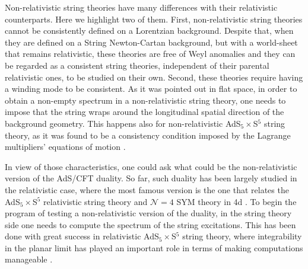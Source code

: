 \documentclass[12pt]{article}
\numberwithin{equation}{section}
\begin{document}
Non-relativistic string theories have many differences with their relativistic counterparts. Here we highlight two of them. First, non-relativistic string theories cannot be consistently defined on a Lorentzian background. Despite that, when they are defined on a String Newton-Cartan background, but with a world-sheet that remains relativistic, these theories are free of Weyl anomalies \cite{Gomis:2019zyu,Gallegos:2019icg} and they can be regarded as a consistent string theories, independent of their parental relativistic ones, to be studied on their own.  
Second, these theories require having a winding mode to be consistent. As it was pointed out in flat space, in order to obtain a non-empty spectrum in a non-relativistic string theory, one needs to impose that the string  wraps around the longitudinal spatial direction of the background geometry. This happens also for non-relativistic AdS$_5\times$S$^5$ string theory, as it was found to be a consistency condition imposed by the Lagrange multipliers' equations of motion \cite{Fontanella:2021btt, Fontanella:2023men}.


In view of those characteristics, one could ask what could be the non-relativistic version of the AdS/CFT duality. So far, such duality has been largely studied in the relativistic case, where the most famous version is the one that relates the AdS$_5\times$S$^5$ relativistic string theory and $\mathcal{N}=4$ SYM theory in 4d \cite{Aharony:1999ti}. To begin the program of testing a non-relativistic version of the duality, in the string theory side one needs to compute the spectrum of the string excitations. This has been done with great success in relativistic AdS$_5\times$S$^5$ string theory, where integrability in the planar limit has played an important role in terms of making computations manageable \cite{Beisert:2010jr}. 
\end{document}
